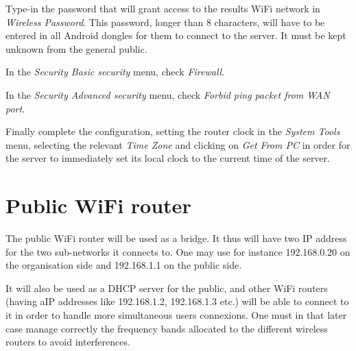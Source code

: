 \documentclass[a4paper]{ffco-rapport}
\begin{document}
	Type-in the password that will grant access to the results WiFi network in \emph{Wireless Password}.
	This password, longer than 8 characters, will have to be entered in all Android dongles for them to connect to the server. It must be kept unknown from the general public.
	
	In the \emph{Security Basic security} menu, check \emph{Firewall}.
	
	In the \emph{Security Advanced security}  menu, check \emph{Forbid ping packet from WAN port}.

	Finally complete the configuration, setting the router clock in the \emph{System Tools} menu, selecting the relevant \emph{Time Zone} and clicking on \emph{Get From PC} in order for the server to immediately set its local clock to the current time of the server.
	

\chapter{Public WiFi router}
	The public WiFi router will be used as a bridge. It thus will have two IP address for the two sub-networks it connects to. One may use for instance 192.168.0.20 on the organisation side and 192.168.1.1 on the public side.

	It will also be used as a DHCP server for the public, and other WiFi routers (having aIP addresses like 192.168.1.2, 192.168.1.3 etc.) will be able to connect to it in order to handle more simultaneous users connexions. One must in that later case manage correctly the frequency bands allocated to the different wireless routers to avoid interferences.
		
\end{document}
